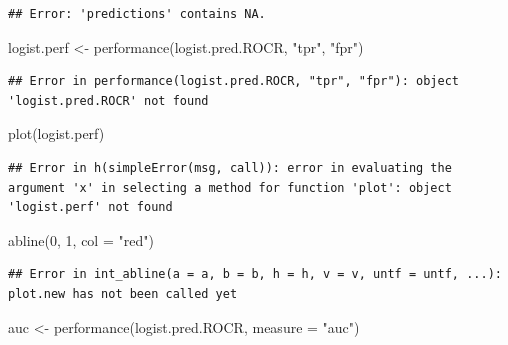 \documentclass[
  12pt,
]{book}
\newenvironment{Shaded}{\begin{snugshade}}{\end{snugshade}}
\newcommand{\AttributeTok}[1]{\textcolor[rgb]{0.77,0.63,0.00}{#1}}
\newcommand{\DecValTok}[1]{\textcolor[rgb]{0.00,0.00,0.81}{#1}}
\newcommand{\FunctionTok}[1]{\textcolor[rgb]{0.00,0.00,0.00}{#1}}
\newcommand{\NormalTok}[1]{#1}
\newcommand{\OtherTok}[1]{\textcolor[rgb]{0.56,0.35,0.01}{#1}}
\newcommand{\SpecialCharTok}[1]{\textcolor[rgb]{0.00,0.00,0.00}{#1}}
\newcommand{\StringTok}[1]{\textcolor[rgb]{0.31,0.60,0.02}{#1}}
\begin{document}
\begin{Shaded}
\end{Shaded}

\begin{verbatim}
## Error: 'predictions' contains NA.
\end{verbatim}

\begin{Shaded}
\begin{Highlighting}[]
\NormalTok{logist.perf }\OtherTok{\textless{}{-}} \FunctionTok{performance}\NormalTok{(logist.pred.ROCR, }\StringTok{"tpr"}\NormalTok{,}
    \StringTok{"fpr"}\NormalTok{)}
\end{Highlighting}
\end{Shaded}

\begin{verbatim}
## Error in performance(logist.pred.ROCR, "tpr", "fpr"): object 'logist.pred.ROCR' not found
\end{verbatim}

\begin{Shaded}
\begin{Highlighting}[]
\FunctionTok{plot}\NormalTok{(logist.perf)}
\end{Highlighting}
\end{Shaded}

\begin{verbatim}
## Error in h(simpleError(msg, call)): error in evaluating the argument 'x' in selecting a method for function 'plot': object 'logist.perf' not found
\end{verbatim}

\begin{Shaded}
\begin{Highlighting}[]
\FunctionTok{abline}\NormalTok{(}\DecValTok{0}\NormalTok{, }\DecValTok{1}\NormalTok{, }\AttributeTok{col =} \StringTok{"red"}\NormalTok{)}
\end{Highlighting}
\end{Shaded}

\begin{verbatim}
## Error in int_abline(a = a, b = b, h = h, v = v, untf = untf, ...): plot.new has not been called yet
\end{verbatim}

\begin{Shaded}
\begin{Highlighting}[]
\NormalTok{auc }\OtherTok{\textless{}{-}} \FunctionTok{performance}\NormalTok{(logist.pred.ROCR, }\AttributeTok{measure =} \StringTok{"auc"}\NormalTok{)}
\end{Highlighting}
\end{Shaded}
\end{document}
